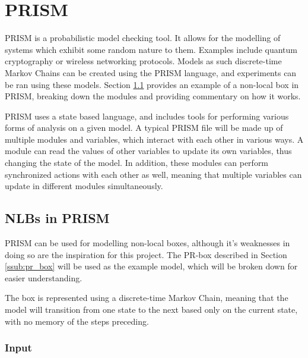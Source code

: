 \documentclass[report.tex]{subfiles}
\begin{document}
\newpage
\section{PRISM} %
\label{sec:prism}
PRISM \cite{KNP11} is a probabilistic model checking tool. It allows for
the modelling of systems which exhibit some random nature to them. Examples
include quantum cryptography or wireless networking protocols. Models as such
discrete-time Markov Chains can be created using the PRISM language, and
experiments can be ran using these models. Section \ref{sub:nlbs_in_prism}
provides an example of a non-local box in PRISM, breaking down the modules and
providing commentary on how it works.

PRISM uses a state based language, and includes tools for performing various
forms of analysis on a given model. A typical PRISM file will be made up of
multiple modules and variables, which interact with each other in various ways.
A module can read the values of other variables to update its own variables,
thus changing the state of the model. In addition, these modules can perform
synchronized actions with each other as well, meaning that multiple variables
can update in different modules simultaneously.

\subsection{NLBs in PRISM} %
\label{sub:nlbs_in_prism}
PRISM can be used for modelling non-local boxes, although it's weaknesses in 
doing so are the inspiration for this project. The PR-box described in
Section \ref{ssub:pr_box} will be used as the example model, which will be
broken down for easier understanding.

The box is represented using a discrete-time Markov Chain, meaning that the 
model will transition from one state to the next based only on the current
state, with no memory of the steps preceding.

\subsubsection{Input} %
\label{ssub:input}
 
\end{document}
